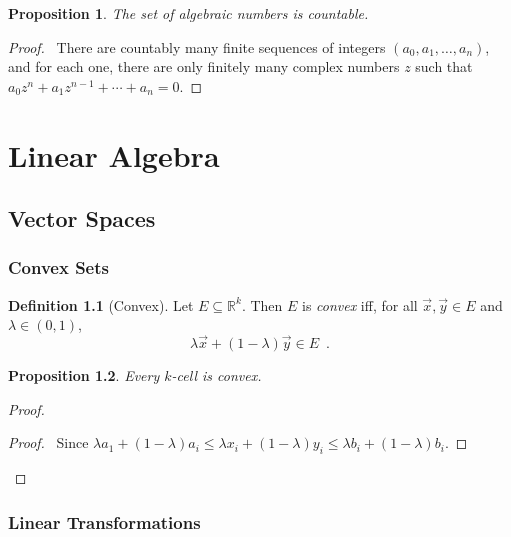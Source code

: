 \documentclass{book}
\let\qed\relax
\newtheorem{prop}{Proposition}[chapter]
\theoremstyle{definition}
\newtheorem{df}[prop]{Definition}
\begin{document}
\begin{prop}
The set of algebraic numbers is countable.
\end{prop}

\begin{proof}
\pf\ There are countably many finite sequences of integers $(a_0, a_1, \ldots, a_n)$, and for each one, there are only finitely many complex numbers $z$ such that $a_0 z^n + a_1 z^{n-1} + \cdots + a_n = 0$. \qed
\end{proof}

\part{Linear Algebra}

\newcommand{\tr}[1]{\ensuremath{\operatorname{tr}}}

\chapter{Vector Spaces}

\section{Convex Sets}

\begin{df}[Convex]
Let $E \subseteq \mathbb{R}^k$. Then $E$ is \emph{convex} iff, for all $\vec{x}, \vec{y} \in E$ and $\lambda \in (0,1)$,
\[ \lambda \vec{x} + (1 - \lambda) \vec{y} \in E \enspace . \]
\end{df}

\begin{prop}
Every $k$-cell is convex.
\end{prop}

\begin{proof}
\pf
{}
\begin{proof}
\pf\ Since $\lambda a_1 + (1-\lambda) a_i \leq \lambda x_i + (1 - \lambda) y_i \leq \lambda b_i + (1 - \lambda) b_i$.
\end{proof}
\qed
\end{proof}

\section{Linear Transformations}
\end{document}

